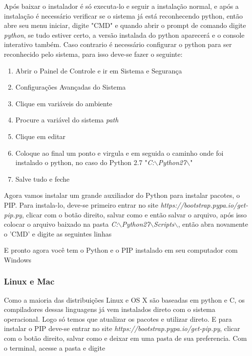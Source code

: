 Após baixar o instalador é só executa-lo e seguir a instalação normal, e após a instalação é necessário verificar se o sistema já está reconhecendo  python, então abre  seu menu iniciar, digite "CMD" e quando abrir o prompt de comando digite \emph{python}, se tudo estiver certo, a versão instalada do python aparecerá e o console interativo também. Caso contrario é necessário configurar o python para ser reconhecido pelo sistema, para isso deve-se fazer o seguinte:
\begin{enumerate}
	\item Abrir o Painel de Controle e ir em Sistema e Segurança
	\item Configurações Avançadas do Sistema
	\item Clique em variáveis do ambiente
	\item Procure a variável do sistema \emph{path}
	\item Clique em editar
	\item Coloque ao final um ponto e virgula e em seguida o caminho onde foi instalado o python, no caso do Python 2.7 "\emph{C:$\backslash$Python27$\backslash$}"
	\item Salve tudo e feche
\end{enumerate}
Agora vamos instalar um grande auxiliador do Python para instalar pacotes, o PIP. Para instala-lo, deve-se primeiro entrar no site \emph{https://bootstrap.pypa.io/get-pip.py}, clicar com o botão direito, salvar como e então salvar o arquivo, após isso colocar o arquivo baixado na pasta \emph{C:$\backslash$Python27$\backslash$Scripts$\backslash$}, então abra novamente o 'CMD' e digite as seguintes linhas


E pronto agora você tem o Python e o PIP instalado em seu computador com Windows
\subsubsection{Linux e Mac}
Como a maioria das distribuições Linux e OS X são baseadas em python e C, os compiladores dessas linguagens já vem instalados direto com o sistema operacional. Logo só temos que atualizar os pacotes e utilizar direto. E para instalar o PIP deve-se entrar no site \emph{https://bootstrap.pypa.io/get-pip.py}, clicar com o botão direito, salvar como e deixar em uma pasta de sua preferencia. Com o terminal, acesse a pasta e digite


